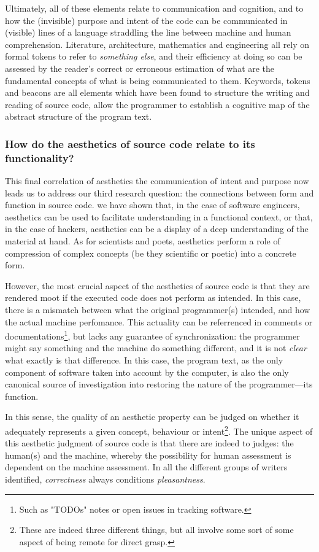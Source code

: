 Ultimately, all of these elements relate to communication and cognition, and to how the (invisible) purpose and intent of the code can be communicated in (visible) lines of a language straddling the line between machine and human comprehension. Literature, architecture, mathematics and engineering all rely on formal tokens to refer to \emph{something else}, and their efficiency at doing so can be assessed by the reader's correct or erroneous estimation of what are the fundamental concepts of what is being communicated to them. Keywords, tokens and beacons are all elements which have been found to structure the writing and reading of source code, allow the programmer to establish a cognitive map of the abstract structure of the program text.

\subsubsection{How do the aesthetics of source code relate to its functionality?} %

This final correlation of aesthetics the communication of intent and purpose now leads us to address our third research question: the connections between form and function in source code. we have shown that, in the case of software engineers, aesthetics can be used to facilitate understanding in a functional context, or that, in the case of hackers, aesthetics can be a display of a deep understanding of the material at hand. As for scientists and poets, aesthetics perform a role of compression of complex concepts (be they scientific or poetic) into a concrete form.

However, the most crucial aspect of the aesthetics of source code is that they are rendered moot if the executed code does not perform as intended. In this case, there is a mismatch between what the original programmer(s) intended, and how the actual machine perfomance. This actuality can be referrenced in comments or documentations\footnote{Such as "TODOs" notes or open issues in tracking software.}, but lacks any guarantee of synchronization: the programmer might say something and the machine do something different, and it is not \emph{clear} what exactly is that difference. In this case, the program text, as the only component of software taken into account by the computer, is also the only canonical source of investigation into restoring the nature of the programmer—its function.

In this sense, the quality of an aesthetic property can be judged on whether it adequately represents a given concept, behaviour or intent\footnote{These are indeed three different things, but all involve some sort of some aspect of being remote for direct grasp.}. The unique aspect of this aesthetic judgment of source code is that there are indeed to judges: the human(s) and the machine, whereby the possibility for human assessment is dependent on the machine assessment. In all the different groups of writers identified, \emph{correctness} always conditions \emph{pleasantness}.

